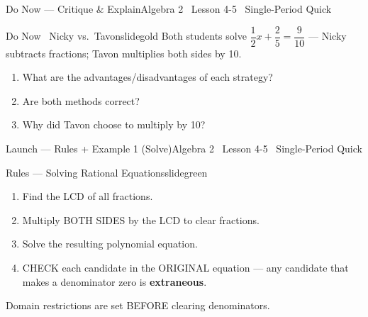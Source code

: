 \documentclass[aspectratio=169, 11pt]{beamer}
\begin{document}

\begin{frame}{Do Now --- Critique \& Explain}{Algebra 2 \textperiodcentered\ Lesson 4-5 \textperiodcentered\ Single-Period Quick}
\vspace{0.2cm}
\begin{projcard}{Do Now \textperiodcentered\ Nicky vs.\ Tavon}{slidegold}
\small
Both students solve \(\dfrac{1}{2}x + \dfrac{2}{5} = \dfrac{9}{10}\) --- Nicky subtracts fractions; Tavon multiplies both sides by 10.

\vspace{0.2cm}
\begin{enumerate}
  \setlength{\itemsep}{2pt}
  \item[(A)] What are the advantages/disadvantages of each strategy?
  \item[(B)] Are both methods correct?
  \item[(C)] Why did Tavon choose to multiply by 10?
\end{enumerate}
\end{projcard}
\end{frame}

\begin{frame}{Launch --- Rules + Example 1 (Solve)}{Algebra 2 \textperiodcentered\ Lesson 4-5 \textperiodcentered\ Single-Period Quick}
\vspace{0.1cm}
\begin{projcard}{Rules --- Solving Rational Equations}{slidegreen}
\small
\begin{enumerate}
  \setlength{\itemsep}{1pt}
  \item Find the LCD of all fractions.
  \item Multiply BOTH SIDES by the LCD to clear fractions.
  \item Solve the resulting polynomial equation.
  \item CHECK each candidate in the ORIGINAL equation --- any candidate that makes a denominator zero is \textbf{extraneous}.
\end{enumerate}
\vspace{0.1cm}
Domain restrictions are set BEFORE clearing denominators.
\end{projcard}
\end{frame}
\end{document}
